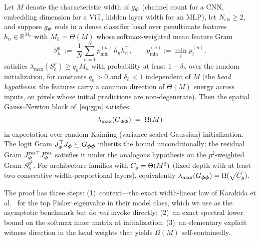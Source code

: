 \begin{lemma}
\label{lem:phi_scaling}
Let $M$ denote the characteristic width of $g_{\boldsymbol{\phi}}$ (channel count for a
CNN, embedding dimension for a ViT, hidden layer width for an MLP), let
$N_{\mathrm{cls}} \geq 2$, and suppose $g_{\boldsymbol{\phi}}$ ends in a dense classifier
head over penultimate features $h_n \in \mathbb{R}^{M_h}$ with
$M_h = \Theta(M)$ whose softmax-weighted mean feature Gram
\begin{equation}
\label{eq:feature_gram}
    S_h^{p} \;:=\; \frac{1}{N} \sum_{n=1}^{N}
        p^{(n)}_{\min}\, h_n h_n^\top,
    \qquad
    p^{(n)}_{\min} := \min_i p^{(n)}_i ,
\end{equation}
satisfies $\lambda_{\max}(S_h^{p}) \geq q_h M_h$ with probability at least
$1 - \delta_h$ over the random initialization, for constants $q_h > 0$ and
$\delta_h < 1$ independent of $M$ (the \emph{head hypothesis}: the features
carry a common direction of $\Theta(M)$ energy across inputs, on pixels
whose initial predictions are non-degenerate). Then the spatial
Gauss--Newton block of~\eqref{eq:ggn} satisfies
\[
    \lambda_{\max}(G_{{\boldsymbol{\phi}}{\boldsymbol{\phi}}}) \;=\; \Omega(M)
\]
in expectation over random Kaiming (variance-scaled Gaussian)
initialization. The logit Gram $J_{\boldsymbol{\phi}}^\top J_{\boldsymbol{\phi}} \succeq G_{{\boldsymbol{\phi}}{\boldsymbol{\phi}}}$
inherits the bound unconditionally; the residual Gram
$J_{\boldsymbol{\phi}}^{\mathrm{res}\top} J_{\boldsymbol{\phi}}^{\mathrm{res}}$ satisfies it under the
analogous hypothesis on the $p^2$-weighted Gram $S_h^{p^2}$. For
architecture families with $C_g = \Theta(M^2)$ (fixed depth with at least
two consecutive width-proportional layers), equivalently
$\lambda_{\max}(G_{{\boldsymbol{\phi}}{\boldsymbol{\phi}}}) = \Omega(\sqrt{C_g})$.
\end{lemma}

The proof has three steps: (1)~context---the exact width-linear law of
Karakida et al.~\citep{karakida2019universal} for the top Fisher
eigenvalue in their model class, which we use as the asymptotic benchmark
but do \emph{not} invoke directly; (2)~an exact spectral lower bound on the
softmax inner matrix at initialization; (3)~an elementary explicit witness
direction in the head weights that yields $\Omega(M)$ self-containedly.

